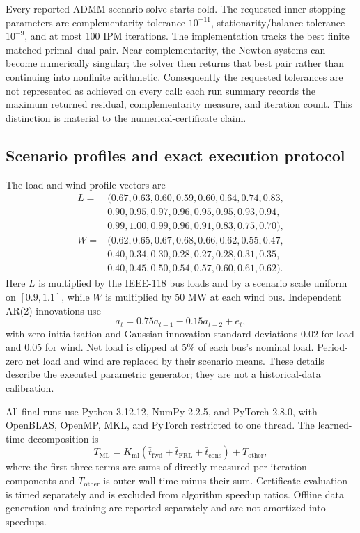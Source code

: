 \documentclass[preprint,12pt,3p]{elsarticle}
\theoremstyle{definition}
\begin{document}
Every reported ADMM scenario solve starts cold. The requested inner stopping parameters are complementarity tolerance $10^{-11}$, stationarity/balance tolerance $10^{-9}$, and at most 100 IPM iterations. The implementation tracks the best finite matched primal--dual pair. Near complementarity, the Newton systems can become numerically singular; the solver then returns that best pair rather than continuing into nonfinite arithmetic. Consequently the requested tolerances are not represented as achieved on every call: each run summary records the maximum returned residual, complementarity measure, and iteration count. This distinction is material to the numerical-certificate claim.

\subsection{Scenario profiles and exact execution protocol}
The load and wind profile vectors are
\begin{align*}
L={}&(0.67,0.63,0.60,0.59,0.60,0.64,0.74,0.83,\\
&0.90,0.95,0.97,0.96,0.95,0.95,0.93,0.94,\\
&0.99,1.00,0.99,0.96,0.91,0.83,0.75,0.70),\\
W={}&(0.62,0.65,0.67,0.68,0.66,0.62,0.55,0.47,\\
&0.40,0.34,0.30,0.28,0.27,0.28,0.31,0.35,\\
&0.40,0.45,0.50,0.54,0.57,0.60,0.61,0.62).
\end{align*}
Here $L$ is multiplied by the IEEE-118 bus loads and by a scenario scale uniform on $[0.9,1.1]$, while $W$ is multiplied by 50 MW at each wind bus. Independent AR(2) innovations use
\[
a_t=0.75a_{t-1}-0.15a_{t-2}+e_t,
\]
with zero initialization and Gaussian innovation standard deviations $0.02$ for load and $0.05$ for wind. Net load is clipped at 5\% of each bus's nominal load. Period-zero net load and wind are replaced by their scenario means. These details describe the executed parametric generator; they are not a historical-data calibration.

All final runs use Python 3.12.12, NumPy 2.2.5, and PyTorch 2.8.0, with OpenBLAS, OpenMP, MKL, and PyTorch restricted to one thread. The learned-time decomposition is
\[
T_{\mathrm{ML}}=K_{\mathrm{ml}}(\bar t_{\mathrm{fwd}}+\bar t_{\mathrm{FRL}}+\bar t_{\mathrm{cons}})+T_{\mathrm{other}},
\]
where the first three terms are sums of directly measured per-iteration components and $T_{\mathrm{other}}$ is outer wall time minus their sum. Certificate evaluation is timed separately and is excluded from algorithm speedup ratios. Offline data generation and training are reported separately and are not amortized into speedups.
\end{document}
